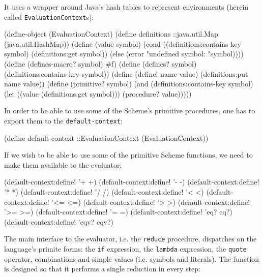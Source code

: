 \documentclass[acmsmall]{acmart}
\newenvironment{Snippet}{\Verbatim[samepage=true]}{\endVerbatim}
\begin{document}
It uses a wrapper around Java's hash tables to represent
environments (herein called \texttt{EvaluationContext}s):

\begin{Snippet}
(define-object (EvaluationContext)
\end{Snippet}
\begin{Snippet}
  (define definitions ::java.util.Map
    (java.util.HashMap))
\end{Snippet}
\begin{Snippet}
  (define (value symbol)
    (cond ((definitions:contains-key symbol)
	   (definitions:get symbol))
	  (else
	   (error "undefined symbol: "symbol))))
\end{Snippet}
\begin{Snippet}
  (define (defines-macro? symbol)
    #f)
\end{Snippet}
\begin{Snippet}
  (define (defines? symbol)
    (definitions:contains-key symbol))
\end{Snippet}
\begin{Snippet}
  (define (define! name value)
    (definitions:put name value))
\end{Snippet}
\begin{Snippet}
  (define (primitive? symbol)
    (and (definitions:contains-key symbol)
	 (let ((value (definitions:get symbol)))
	   (procedure? value)))))
\end{Snippet}

In order to be able to use some of the Scheme's primitive
procedures, one has to export them to the \texttt{default-context}:

\begin{Snippet}
(define default-context ::EvaluationContext
  (EvaluationContext))
\end{Snippet}

If we wish to be able to use some of the primitive Scheme
functions, we need to make them available to the evaluator:

\begin{Snippet}
(default-context:define! '+ +)
(default-context:define! '- -)
(default-context:define! '* *)
(default-context:define! '/ /)
(default-context:define! '< <)
(default-context:define! '<= <=)
(default-context:define! '> >)
(default-context:define! '>= >=)
(default-context:define! '= =)
(default-context:define! 'eq? eq?)		
(default-context:define! 'eqv? eqv?)
\end{Snippet}

The main interface to the evaluator, i.e. the \texttt{reduce} procedure,
dispatches on the language's primite forms: the \texttt{if} expression,
the \texttt{lambda} expression, the \texttt{quote} operator, combinations
and simple values (i.e. symbols and literals). The function
is designed so that it performs a single reduction in every step:
\end{document}
